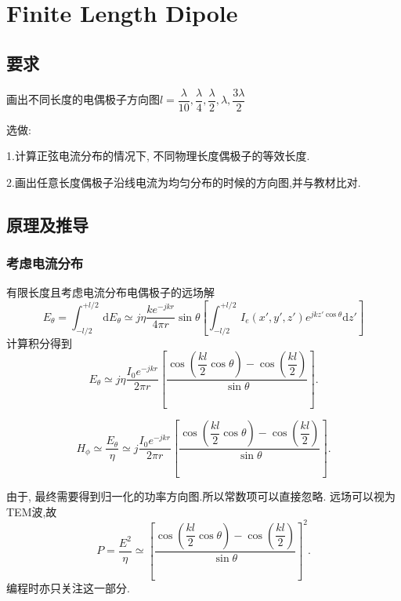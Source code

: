 


\section{Finite Length Dipole}
\subsection{要求}
\noindent 画出不同长度的电偶极子方向图$l=\dfrac{\lambda}{10},\dfrac{\lambda}{4},\dfrac{\lambda}{2},\lambda,\dfrac{3\lambda}{2}$ 

\noindent 选做:

1.计算正弦电流分布的情况下, 不同物理长度偶极子的等效长度.

2.画出任意长度偶极子沿线电流为均匀分布的时候的方向图,并与教材比对.

\subsection{原理及推导}
\subsubsection{考虑电流分布}
\noindent 有限长度且考虑电流分布电偶极子的远场解
\begin{equation}
	E_\theta=\int_{-l/2}^{+l/2}\,\mathrm{d}E_\theta\simeq j\eta\dfrac{ke^{-jkr}}{4\pi r}\sin\theta\left[\int_{-l/2}^{+l/2}\,I_e\left(x',y',z' \right) e^{jkz'\cos\theta}\mathrm{d}z'\right]
\end{equation}
计算积分得到
\begin{equation}
	E_\theta\simeq j\eta\dfrac{I_0e^{-jkr}}{2\pi r}\left[\dfrac{\cos\left(\dfrac{kl}{2}\cos\theta\right)-\cos\left(\dfrac{kl}{2}\right)}{\sin\theta}\right].
\end{equation}


\begin{equation}
	H_\phi\simeq \dfrac{E_\theta}{\eta}\simeq j\dfrac{I_0e^{-jkr}}{2\pi r}\left[\dfrac{\cos\left(\dfrac{kl}{2}\cos\theta\right)-\cos\left(\dfrac{kl}{2}\right)}{\sin\theta}\right].
\end{equation}

由于, 最终需要得到归一化的功率方向图.所以常数项可以直接忽略. 
远场可以视为TEM波,故
\begin{equation}
	P=\dfrac{E^2}{\eta} \simeq \left[\dfrac{\cos\left(\dfrac{kl}{2}\cos\theta\right)-\cos\left(\dfrac{kl}{2}\right)}{\sin\theta}\right]^2.
\end{equation}
编程时亦只关注这一部分. 
